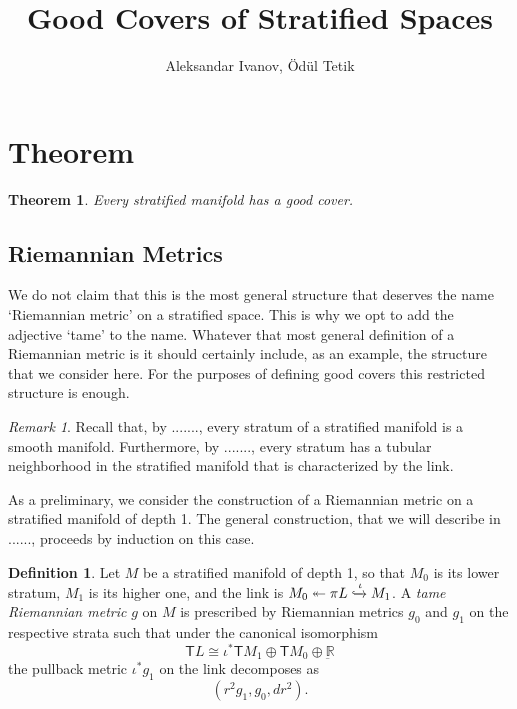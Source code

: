 \documentclass[12pt,a4paper]{article}
\newcounter{counter} \numberwithin{counter}{section}
\theoremstyle{definition}
\newtheorem{definition}[counter]{Definition}
\theoremstyle{plain}
\newtheorem{theorem}[counter]{Theorem}
\theoremstyle{remark}
\newtheorem{remark}[counter]{Remark}
\begin{document}
\title{\sc Good Covers of Stratified Spaces}
\author{Aleksandar Ivanov, Ödül Tetik}
\date{}
\maketitle

\tableofcontents

\section{Theorem}

\begin{theorem}
    Every stratified manifold has a good cover.
\end{theorem}

\subsection{Riemannian Metrics}

We do not claim that this is the most general structure that deserves the name `Riemannian metric' on a stratified space. This is why we opt to add the adjective `tame' to the name. Whatever that most general definition of a Riemannian metric is it should certainly include, as an example, the structure that we consider here. For the purposes of defining good covers this restricted structure is enough.

\begin{remark}
    Recall that, by ......., every stratum of a stratified manifold is a smooth manifold. Furthermore, by ......., every stratum has a tubular neighborhood in the stratified manifold that is characterized by the link.
\end{remark}


As a preliminary, we consider the construction of a Riemannian metric on a stratified manifold of depth 1. The general construction, that we will describe in ......, proceeds by induction on this case.


\begin{definition}
    Let $M$ be a stratified manifold of depth 1, so that $M_0$ is its lower stratum, $M_1$ is its higher one, and the link is $M_0 \twoheadleftarrow{\pi} L \xhookrightarrow{\iota} M_1$. A \emph{tame Riemannian metric} $g$ on $M$ is prescribed by Riemannian metrics $g_0$ and $g_1$ on the respective strata such that under the canonical isomorphism
    \begin{equation}
        \mathsf{T}L \cong \iota^*\mathsf{T}M_1 \oplus \mathsf{T}M_0 \oplus \underbar{\mathbb{R}}
    \end{equation}
    the pullback metric $\iota^* g_1$ on the link decomposes as
    \begin{equation}
        (r^2 g_1, g_0, dr^2).
    \end{equation}
\end{definition}
\end{document}
